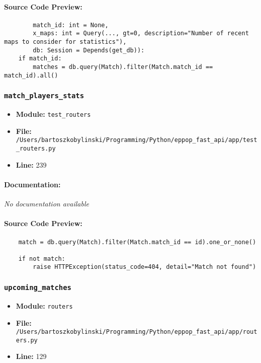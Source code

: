 \documentclass[11pt,a4paper]{article}
\begin{document}
\paragraph{Source Code Preview:}
\begin{verbatim}
        match_id: int = None,
        x_maps: int = Query(..., gt=0, description="Number of recent maps to consider for statistics"),
        db: Session = Depends(get_db)):
    if match_id:
        matches = db.query(Match).filter(Match.match_id == match_id).all()
\end{verbatim}

\vspace{1em}
\subsubsection{\texttt{match\_players\_stats}}

\begin{itemize}
    \item \textbf{Module:} \texttt{test\_routers}
    \item \textbf{File:} \texttt{/Users/bartoszkobylinski/Programming/Python/eppop\_fast\_api/app/test\_routers.py}
    \item \textbf{Line:} 239
\end{itemize}

\paragraph{Documentation:} \textit{No documentation available}

\paragraph{Source Code Preview:}
\begin{verbatim}
    match = db.query(Match).filter(Match.match_id == id).one_or_none()

    if not match:
        raise HTTPException(status_code=404, detail="Match not found")

\end{verbatim}

\vspace{1em}
\subsubsection{\texttt{upcoming\_matches}}

\begin{itemize}
    \item \textbf{Module:} \texttt{routers}
    \item \textbf{File:} \texttt{/Users/bartoszkobylinski/Programming/Python/eppop\_fast\_api/app/routers.py}
    \item \textbf{Line:} 129
\end{itemize}
\end{document}
